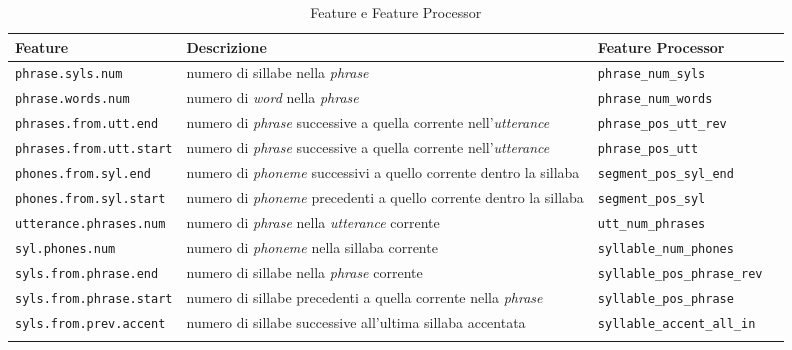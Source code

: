 		\begin{center}
        		\bgroup
        		\def\arraystretch{1.8}
        		\begin{longtable}{ | l | p{2cm} | p{4.7cm} | p{2.5cm} |}
        		\hline
        		\textbf{Feature} & \textbf{Descrizione}
        		& \textbf{Feature Processor} \\ \hline
        		\texttt{phrase.syls.num} & numero di sillabe nella \textit{phrase} & \texttt{phrase\_num\_syls} \newline  \\ \hline
        		\texttt{phrase.words.num} & numero di \textit{word} nella \textit{phrase} & \texttt{phrase\_num\_words} \newline  \\ \hline
       			\texttt{phrases.from.utt.end} & numero di \textit{phrase} successive a quella corrente nell'\textit{utterance}  & \texttt{phrase\_pos\_utt\_rev} \newline  \\ \hline
        		\texttt{phrases.from.utt.start} & numero di \textit{phrase} successive a quella corrente nell'\textit{utterance} & \texttt{phrase\_pos\_utt} \newline  \\ \hline
         
        		\texttt{phones.from.syl.end} & numero di \textit{phoneme} successivi a quello corrente dentro la sillaba & \texttt{segment\_pos\_syl\_end} \newline  \\ \hline
        		\texttt{phones.from.syl.start} & numero di \textit{phoneme} precedenti a quello corrente dentro la sillaba & \texttt{segment\_pos\_syl} \newline  \\ \hline
       			\texttt{utterance.phrases.num} & numero di \textit{phrase} nella \textit{utterance} corrente & \texttt{utt\_num\_phrases}  \newline  \\ \hline
        	 	\texttt{syl.phones.num} & numero di \textit{phoneme} nella sillaba corrente & \texttt{syllable\_num\_phones} \newline  \\ \hline                 

       			\texttt{syls.from.phrase.end} & numero di sillabe nella \textit{phrase} corrente & \texttt{syllable\_pos\_phrase\_rev}  \newline  \\ \hline
        		\texttt{syls.from.phrase.start} & numero di sillabe precedenti a quella corrente nella \textit{phrase}  & \texttt{syllable\_pos\_phrase} \newline  \\ \hline
       			\texttt{syls.from.prev.accent} & numero di sillabe successive all'ultima sillaba accentata & \texttt{syllable\_accent\_all\_in} \newline  \\ \hline

        	        \caption{Feature e Feature Processor}
        	        \end{longtable}
        	        \egroup
     	        \end{center}
